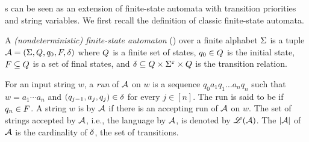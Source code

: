  
{\PSST}s can be seen as an extension of finite-state automata with transition priorities and string variables. We first recall the definition of classic finite-state automata.

\begin{definition} \label{def:nfa}
	A \emph{(nondeterministic) finite-state automaton}
	(\FA{}) over a finite alphabet $\Sigma$ is a tuple $\mathcal{A} =
	(\Sigma, Q, q_0, F, \delta)$ where 
	$Q$ is a finite set of 
	states, $q_0\in Q$ is
	the initial state, $F\subseteq Q$ is a set of final states, and 
	$\delta\subseteq Q \times 
	\Sigma^\varepsilon \times  Q$ is the
	transition relation. 
\end{definition}

For an input string $w$, a \emph{run} of $\mathcal{A}$ on $w$
is a sequence $q_0 a_1 q_1 \ldots a_n q_n$ such that $w = a_1 \cdots a_n$ and $(q_{j-1}, a_{j}, q_{j}) \in
\delta$ for every $j \in [n]$.
%
The run is said to be  if $q_n \in F$.
A string $w$ is  by $\mathcal{A}$ if there is an accepting run of
$\mathcal{A}$ on $w$. 
The set of strings accepted by $\mathcal{A}$, i.e., the language  by $\mathcal{A}$, is denoted by $\mathscr{L}(\mathcal{A})$.
The  $|\mathcal{A}|$ of $\mathcal{A}$ is the cardinality of $\delta$, the set of transitions.


